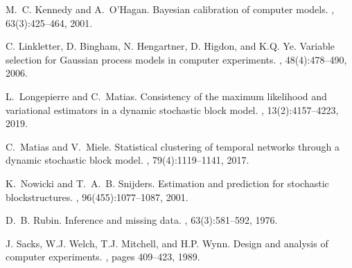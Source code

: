 \documentclass[nopagenumber,9pt]{beamer}
\begin{document}
\begin{thebibliography}{NS01}
M.~C. Kennedy and A.~O'Hagan.
\newblock Bayesian calibration of computer models.
, 63(3):425--464, 2001.

C. Linkletter, D. Bingham, N. Hengartner, D. Higdon, and
  K.Q. Ye.
\newblock Variable selection for {Gaussian} process models in computer
  experiments.
, 48(4):478--490, 2006.

L.~Longepierre and C.~Matias.
\newblock Consistency of the maximum likelihood and variational estimators in a
  dynamic stochastic block model.
, 13(2):4157--4223, 2019.

C.~Matias and V.~Miele.
\newblock Statistical clustering of temporal networks through a dynamic
  stochastic block model.
, 79(4):1119--1141, 2017.

K.~Nowicki and T.~A.~B. Snijders.
\newblock Estimation and prediction for stochastic blockstructures.
,
  96(455):1077--1087, 2001.

D.~B. Rubin.
\newblock Inference and missing data.
, 63(3):581--592, 1976.

J. Sacks, W.J. Welch, T.J. Mitchell, and H.P. Wynn.
\newblock Design and analysis of computer experiments.
, pages 409--423, 1989.


\end{thebibliography}
\end{document}
